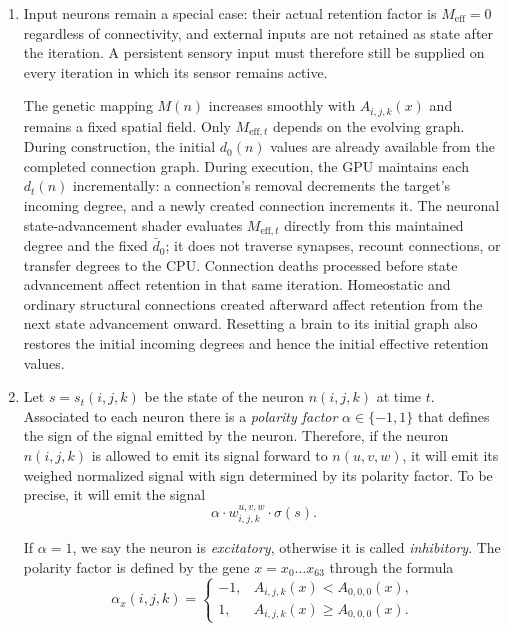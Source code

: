 \documentclass[12pt,a4paper]{article}
\begin{document}
\begin{enumerate}
	Writing $s_t(n)$ for the state already carried into the state-advancement stage and $Q_t(n)$ for the signed sum of incoming signals accumulated in that iteration, the next provisional state is
	$$\widetilde{s}_{t+1}(n)=\max\left\{0,\,M_{\mathrm{eff},t}(n)s_t(n)+Q_t(n)\right\}.$$
	This provisional value is subsequently subject to the previously defined activity-trace-dependent homeostatic correction. No other firing, saturation, or plasticity rule is changed by the connectivity-dependent retention.
	
	\item Input neurons remain a special case: their actual retention factor is $M_{\mathrm{eff}}=0$ regardless of connectivity, and external inputs are not retained as state after the iteration. A persistent sensory input must therefore still be supplied on every iteration in which its sensor remains active.
	
	The genetic mapping $M(n)$ increases smoothly with $A_{i,j,k}(x)$ and remains a fixed spatial field. Only $M_{\mathrm{eff},t}$ depends on the evolving graph. During construction, the initial $d_0(n)$ values are already available from the completed connection graph. During execution, the GPU maintains each $d_t(n)$ incrementally: a connection's removal decrements the target's incoming degree, and a newly created connection increments it. The neuronal state-advancement shader evaluates $M_{\mathrm{eff},t}$ directly from this maintained degree and the fixed $\bar d_0$; it does not traverse synapses, recount connections, or transfer degrees to the CPU. Connection deaths processed before state advancement affect retention in that same iteration. Homeostatic and ordinary structural connections created afterward affect retention from the next state advancement onward. Resetting a brain to its initial graph also restores the initial incoming degrees and hence the initial effective retention values.
	
	\item Let $s = s_t(i, j, k)$ be the state of the neuron $n(i, j, k)$ at time $t$. Associated to each neuron there is a \emph{polarity factor} $\alpha \in \{-1, 1\}$ that defines the sign of the signal emitted by the neuron. Therefore, if the neuron $n(i, j, k)$ is allowed to emit its signal forward to $n(u, v, w)$, it will emit its weighed normalized signal with sign determined by its polarity factor. To be precise, it will emit the signal
	$$\alpha \cdot w_{i, j, k}^{u, v, w} \cdot \sigma(s).$$
	
	If $\alpha = 1$, we say the neuron is \emph{excitatory}, otherwise it is called \emph{inhibitory}. The polarity factor is defined by the gene $x = x_0 \ldots x_{63}$ through the formula
	$$\alpha_x(i, j, k) = 
		\left\{\begin{array}{ll}
			-1, & A_{i,j,k}(x) < A_{0,0,0}(x),\\
			1, & A_{i,j,k}(x) \geq A_{0,0,0}(x).
		\end{array}\right.$$
	

\end{enumerate}
\end{document}
